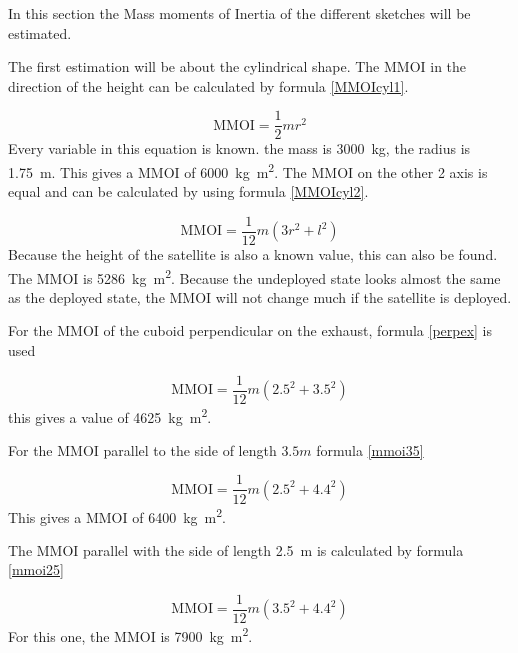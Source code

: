 

In this section the Mass moments of Inertia of the different sketches
will be estimated.


The first estimation will be about the cylindrical shape. The MMOI in
the direction of the height can be calculated by formula
\ref{MMOIcyl1}.

\begin{equation}
  \label{MMOIcyl1}
  \mathrm{MMOI}=\frac{1}{2}mr^2
\end{equation}
Every variable in this equation is known. the mass is \SI{3000}{kg},
the radius is \SI{1.75}{m}. This gives a MMOI of \SI{6000}{kg.m^2}. The
MMOI on the other 2 axis is equal and can be calculated by using
formula \ref{MMOIcyl2}.

\begin{equation}
  \label{MMOIcyl2}
  \mathrm{MMOI}=\frac{1}{12}m(3r^2+l^2)
\end{equation}
Because the height of the satellite is also a known value, this can
also be found.  The MMOI is \SI{5286}{kg.m^2}. Because the undeployed
state looks almost the same as the deployed state, the MMOI will not
change much if the satellite is deployed.


For the MMOI of the cuboid perpendicular on the exhaust, formula
\ref{perpex} is used

\begin{equation}
  \label{perpex}
  \mathrm{MMOI}=\frac{1}{12}m(2.5^2+3.5^2)
\end{equation}
this gives a value of \SI{4625}{kg.m^2}.

For the MMOI parallel to the side of length $3.5m$ formula \ref{mmoi35}

\begin{equation}
  \label{mmoi35}
  \mathrm{MMOI}=\frac{1}{12}m(2.5^2+4.4^2)
\end{equation}
This gives a MMOI of \SI{6400}{kg.m^2}.

The MMOI parallel with the side of length \SI{2.5}{m} is calculated by
formula \ref{mmoi25}

\begin{equation}
  \label{mmoi25}
  \mathrm{MMOI}=\frac{1}{12}m(3.5^2+4.4^2)
\end{equation}
For this one, the MMOI is \SI{7900}{kg.m^2}.

